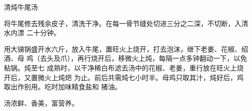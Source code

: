 \begin{recipe}{清炖牛尾汤}

\ingredients


\preparation

将牛尾修去残余皮子，清洗干净。在每一骨节缝处切进三分之二深，不切断，入清水内漂
二十分钟。

用大锑锅盛开水六斤，放入牛尾，置旺火上烧开，打去泡沫，继下老姜、花椒、绍酒、母
鸡（去头及爪），再行烧开后，移微火上炖，每隔一点多钟翻动一下，以免粘锅。炖至七
成熟时，以干净稀白布滤去汤中的花椒、老姜，重行放在旺火上烧开后，又置微火上炖𤆵
为止。前后共需炖七小时半。母鸡只取其汁，炖好后，鸡取出作别用。吃时加味精食盐和
猪油。

\features

汤浓鲜、香美，富营养。

\end{recipe}

